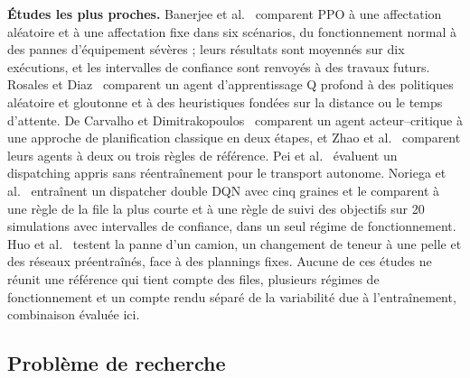 \documentclass[11pt,a4paper]{article}
\newif\ifrevmarks
\newcommand{\revtag}[1]{\ifrevmarks\textsuperscript{\textcolor{red!70!black}{\scriptsize[#1]}}\fi}
\newenvironment{revbloc}[1]{\par\ifrevmarks\color{revcolor}\noindent\revtag{#1}\ \fi}{\par}
\newif\ifcorrmarks
\newcommand{\corr}[1]{\ifcorrmarks\textcolor{corrcolor}{#1}\else#1\fi}
\newenvironment{corrbloc}{\par\ifcorrmarks\color{corrcolor}\fi}{\par}
\begin{document}
\begin{revbloc}{M24 (fusion §1.3, §2.4, §3)}
\begin{corrbloc}
\textbf{Études les plus proches.} Banerjee et al.~\cite{Banerjee2025} comparent PPO à une affectation aléatoire et à une affectation fixe dans six scénarios, du fonctionnement normal à des pannes d'équipement sévères ; leurs résultats sont moyennés sur dix exécutions, et les intervalles de confiance sont renvoyés à des travaux futurs. Rosales et Diaz~\cite{FranciscoRosales2025} comparent un agent d'apprentissage Q profond à des politiques aléatoire et gloutonne et à des heuristiques fondées sur la distance ou le temps d'attente. De Carvalho et Dimitrakopoulos~\cite{deCarvalho2023} comparent un agent acteur--critique à une approche de planification classique en deux étapes, et Zhao et al.~\cite{Zhao2025} comparent leurs agents à deux ou trois règles de référence. Pei et al.~\cite{Pei2025} évaluent un dispatching appris sans réentraînement pour le transport autonome. \corr{Noriega et al.~\cite{Noriega2025} entraînent un dispatcher double DQN avec cinq graines et le comparent à une règle de la file la plus courte et à une règle de suivi des objectifs sur 20 simulations avec intervalles de confiance, dans un seul régime de fonctionnement. Huo et al.~\cite{Huo2024} testent la panne d'un camion, un changement de teneur à une pelle et des réseaux préentraînés, face à des plannings fixes.} Aucune de ces études ne réunit une référence qui tient compte des files, plusieurs régimes de fonctionnement et un compte rendu séparé de la variabilité due à l'entraînement, combinaison évaluée ici.
\end{corrbloc}
\end{revbloc}

\subsection{Problème de recherche}
\label{sec:problem-statement}
\end{document}
